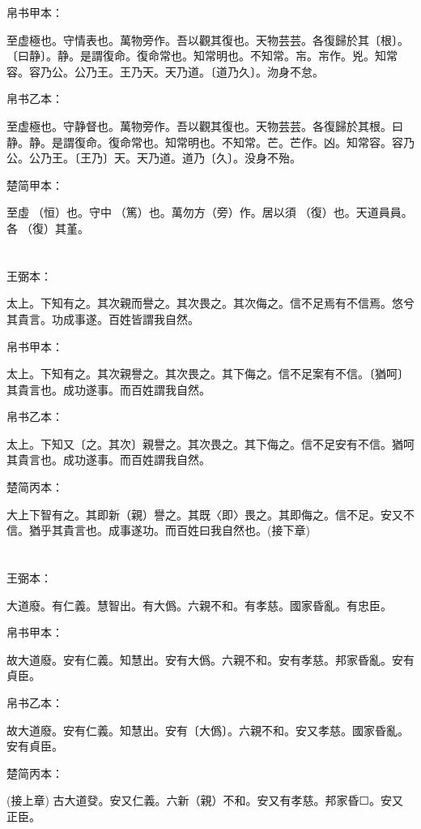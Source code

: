 \documentclass[a5paper]{ctexbook}
\begin{document}
    
    帛书甲本：

    至虚極也。守情表也。萬物旁作。吾以觀其復也。天物芸芸。各復歸於其〔根〕。〔曰静〕。静。是謂復命。復命常也。知常明也。不知常。㠵。㠵作。兇。知常容。容乃公。公乃王。王乃天。天乃道。〔道乃久〕。沕身不怠。

    帛书乙本：

    至虚極也。守静督也。萬物旁作。吾以觀其復也。天物芸芸。各復歸於其根。曰静。静。是謂復命。復命常也。知常明也。不知常。芒。芒作。凶。知常容。容乃公。公乃王。〔王乃〕天。天乃道。道乃〔久〕。没身不殆。

    楚简甲本：

    至虛𠄨（恒）也。守中󶴮（篤）也。萬勿方（旁）作。居以須󵯿（復）也。天道員員。各󵯿（復）其堇。

    \chapter{}
    王弼本：

    太上。下知有之。其次親而譽之。其次畏之。其次侮之。信不足焉有不信焉。悠兮其貴言。功成事遂。百姓皆謂我自然。

    
    帛书甲本：

    太上。下知有之。其次親譽之。其次畏之。其下侮之。信不足案有不信。〔猶呵〕其貴言也。成功遂事。而百姓謂我自然。

    帛书乙本：

    太上。下知又〔之。其次〕親譽之。其次畏之。其下侮之。信不足安有不信。猶呵其貴言也。成功遂事。而百姓謂我自然。

    楚简丙本：

    大上下智有之。其即新（親）譽之。其既〈即〉畏之。其即侮之。信不足。安又不信。猶乎其貴言也。成事遂功。而百姓曰我自然也。(接下章)

    \chapter{}
    王弼本：

    大道廢。有仁義。慧智出。有大僞。六親不和。有孝慈。國家昏亂。有忠臣。

    
    帛书甲本：

    故大道廢。安有仁義。知慧出。安有大僞。六親不和。安有孝慈。邦家昏亂。安有貞臣。

    帛书乙本：

    故大道廢。安有仁義。知慧出。安有〔大僞〕。六親不和。安又孝慈。國家昏亂。安有貞臣。

    楚简丙本：

    (接上章) 古大道癹。安又仁義。六新（親）不和。安又有孝慈。邦家昏☐。安又正臣。
\end{document}
